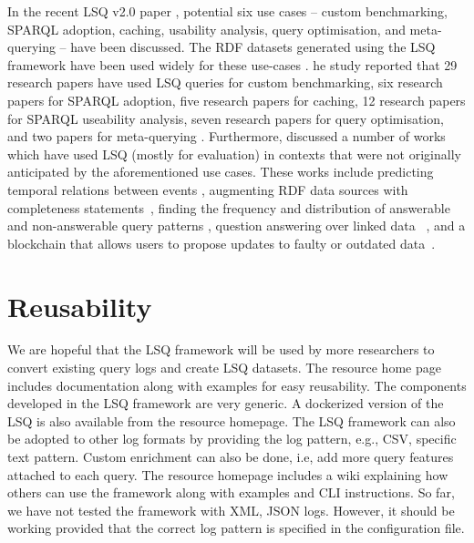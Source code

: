 In the recent LSQ v2.0 paper \cite{stadleralsq}, potential six use cases -- custom benchmarking, SPARQL adoption, caching, usability analysis, query optimisation, and meta-querying -- have been discussed.
The RDF datasets generated using the LSQ framework have been used widely for these use-cases \cite{stadleralsq}.
 he study \cite{stadleralsq} reported that 29 research papers have used LSQ queries for custom benchmarking, six  research papers for SPARQL adoption, five research papers for caching,
 12 research papers for SPARQL useability analysis, seven research papers for query optimisation, and two papers for meta-querying  \cite{stadleralsq}.
 Furthermore, \cite{stadleralsq} discussed a number of works which have used LSQ (mostly for evaluation) in contexts that were not originally anticipated by the aforementioned use cases.
 These works include predicting temporal relations between events \cite{georgala2016efficient}, augmenting RDF data sources with completeness statements~\cite{fafalios2019many},
 finding the frequency and distribution of answerable and non-answerable query patterns \cite{fafalios2019many}, question answering over linked data ~\cite{singh2019qaldgen},
 and a blockchain that allows users to propose updates to faulty or outdated data~\cite{AebeloeMH21}. 

\section{Reusability}
We are hopeful that the LSQ framework will be used by more researchers to convert existing query logs and create LSQ datasets. The resource home page includes documentation along with examples for easy reusability. The components developed in the LSQ framework are very generic. A dockerized version of the LSQ is also available from the resource homepage. The LSQ framework can also be adopted to other log formats by providing the log pattern, e.g., CSV, specific text pattern. Custom enrichment can also be done, i.e, add more query features attached to each query. The resource homepage includes a wiki explaining how others can use the framework along with examples and CLI instructions. So far, we have not tested the framework with XML, JSON logs. However, it should be working provided that the correct log pattern is specified in the configuration file. 



